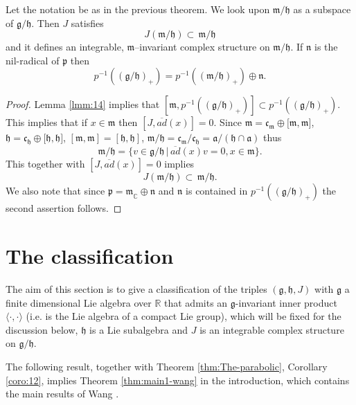 \documentclass{amse-new}
\numberwithin{equation}{section} %
\begin{document}
\begin{corollary}
\label{BasicObs} Let the notation be as in the previous theorem. We look upon
$\mathfrak{m}/\mathfrak{h}$ as a subspace of $\mathfrak{g}/\mathfrak{h}$. Then $J$ satisfies
\[
J(\mathfrak{m}/\mathfrak{h})\subset\, \mathfrak{m}/\mathfrak{h}
\]
and it defines an integrable, $\mathfrak{m}$--invariant complex structure on
$\mathfrak{m}/\mathfrak{h}.$ If $\mathfrak{n}$ is the nil-radical of
$\mathfrak{p}$ then
\[
p^{-1} ((\mathfrak{g}/\mathfrak{h})_+)=p^{-1}((\mathfrak{m}/\mathfrak{h}%
)_{+})\oplus\mathfrak{n}\text{.}%
\]
\end{corollary}

\begin{proof}
Lemma \ref{lmm:14} implies that $[\mathfrak{m}, p^{-1}((\mathfrak{g}/\mathfrak{h})_{+})]\subset p^{-1} ((\mathfrak{g}/\mathfrak{h})_+)$. This
implies that if $x\in\mathfrak{m}$ then $[J,\overline{ad}(x)]=0$. Since
$\mathfrak{m}=\mathfrak{c}_{\mathfrak{m}}\oplus\lbrack\mathfrak{m}%
,\mathfrak{m}]$, $\mathfrak{h}=\mathfrak{c}_{\mathfrak{h}}\oplus\lbrack\mathfrak{h}%
,\mathfrak{h}]$, $[\mathfrak{m}, \mathfrak{m}]=[\mathfrak{h}, \mathfrak{h}]$,  $\mathfrak{m}/\mathfrak{h}=\mathfrak{c}_{\mathfrak{m}%
}/\mathfrak{c}_{\mathfrak{h}}=\mathfrak{a}/\left(  \mathfrak{h}\cap
\mathfrak{a}\right)  $ thus
\[
\mathfrak{m/\mathfrak{h}}=\{v\in\mathfrak{g/\mathfrak{h}}\, |\, \overline
{ad}(x)v=0,x\in\mathfrak{m}\}.
\]
This together with $[J, \overline{ad}(x)]=0$ implies
\[
J(\mathfrak{m}/\mathfrak{h})\subset\, \mathfrak{m}/\mathfrak{h}.
\]
We also note that since $\mathfrak{p=m}_{\mathbb{C}}\oplus\mathfrak{n}$ and
$\mathfrak{n}$ is contained in $p^{-1} ((\mathfrak{g}/\mathfrak{h})_+)$ the
second assertion follows.
\end{proof}

\section{The classification}

The aim of this section is to give a classification of the triples
$(\mathfrak{g},\mathfrak{h},J)$ with $\mathfrak{g}$ a finite dimensional Lie
algebra over $\mathbb{R}$ that admits an $\mathfrak{g}$-invariant inner
product $\langle \cdot, \cdot\rangle$ (i.e. is the Lie algebra of a compact Lie group), which will be fixed for the discussion below, $\mathfrak{h}$ is a
Lie subalgebra and $J$ is an integrable complex structure on $\mathfrak{g}%
/\mathfrak{h}$.

The following  result, together with Theorem \ref{thm:The-parabolic}, Corollary \ref{coro:12}, implies  Theorem \ref{thm:main1-wang} in the introduction, which contains the main results of Wang \cite{Wang}.
\end{document}
